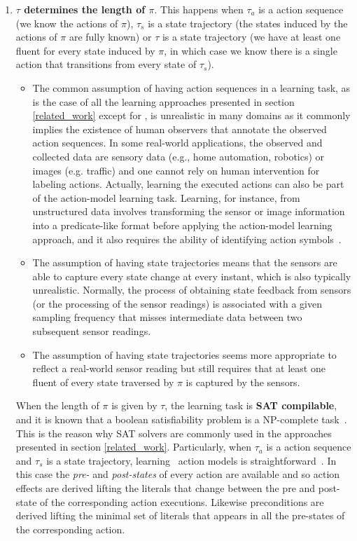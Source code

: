 \begin{enumerate}
\item \textcolor[rgb]{1.00,0.00,0.00}{\textbf{$\tau$ determines the length of $\pi$}. This happens when $\tau_a$ is a \FO action sequence (we know the actions of $\pi$), $\tau_s$ is a \FO state trajectory (the states induced by the actions of $\pi$ are fully known) or $\tau$ is a \POstar state trajectory (we have at least one fluent for every state induced by $\pi$, in which case we know there is a single action that transitions from every state of $\tau_s$).}

    \begin{itemize}
    \item The common assumption of having \FO action sequences in a learning task, as is the case of all the learning approaches presented in section \ref{related_work} except for \FAMA, is unrealistic in many domains as it commonly implies the existence of human observers that annotate the observed action sequences. In some real-world applications, the observed and collected data are sensory data (e.g., home automation, robotics) or images (e.g. traffic) and one cannot rely on human intervention for labeling actions. Actually, learning the executed actions can also be part of the action-model learning task. Learning, for instance, from unstructured data involves transforming the sensor or image information into a predicate-like format before applying the action-model learning approach, and it also requires the ability of identifying action symbols~\cite{AsaiF18}.
    \item The assumption of having \FO state trajectories means that the sensors are able to capture every state change at every instant, which is also typically unrealistic. Normally, the process of obtaining state feedback from sensors (or the processing of the sensor readings) is associated with a given sampling frequency that misses intermediate data between two subsequent sensor readings.
    \item \textcolor[rgb]{1.00,0.00,0.00}{The assumption of having \POstar state trajectories seems more appropriate to reflect a real-world sensor reading but still requires that at least one fluent of every state traversed by $\pi$ is captured by the sensors.}
    \end{itemize}

When the length of $\pi$ is given by $\tau$, the learning task is \textbf{SAT compilable}, and it is known that a boolean satisfiability problem is a NP-complete task~\cite{cook1971complexity}. This is the reason why SAT solvers are commonly used in the approaches presented in section \ref{related_work}. Particularly, when $\tau_a$ is a \FO action sequence and $\tau_s$ is a \FO state trajectory, learning \strips\ action models is straightforward~\cite{jimenez2012review}. In this case the {\em pre-} and {\em post-states} of every action are available and so action effects are derived lifting the literals that change between the pre and post-state of the corresponding action executions. Likewise preconditions are derived lifting the minimal set of literals that appears in all the pre-states of the corresponding action.



\end{enumerate}
